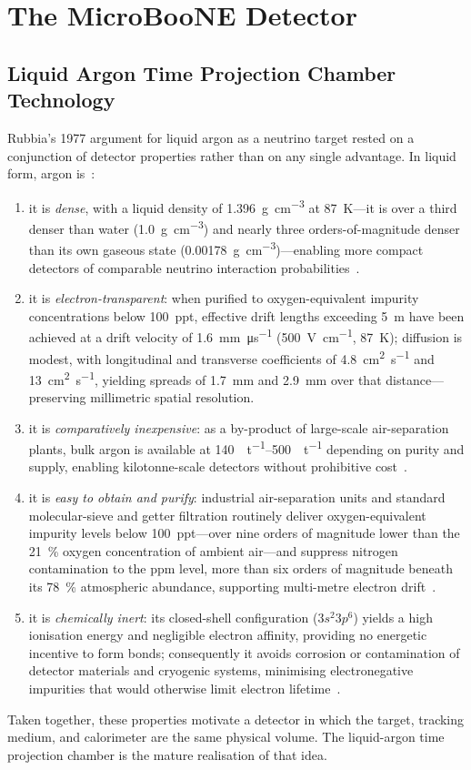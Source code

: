 \section{The MicroBooNE Detector}

\subsection{Liquid Argon Time Projection Chamber Technology}

Rubbia's 1977 argument for liquid argon as a neutrino target rested on a
conjunction of detector properties rather than on any single advantage. In
liquid form, argon is~\cite{Rubbia1977}:
\begin{enumerate}
\item it is \emph{dense}, with a liquid density of \SI{1.396}{\gram\per\cubic\centi\metre} at \qty{87}{\K}---it is over a third denser than water (\SI{1.0}{\gram\per\cubic\centi\metre}) and nearly three orders-of-magnitude denser than its own gaseous state (\SI{0.00178}{\gram\per\cubic\centi\metre})---enabling more compact detectors of comparable neutrino interaction probabilities~\cite{NISTLArDensity}.
\item it is \emph{electron-transparent}: when purified to oxygen-equivalent impurity concentrations below \qty{100}{ppt}, effective drift lengths exceeding \qty{5}{\m} have been achieved at a drift velocity of \qty{1.6}{\mm\per\micro\s} (\qty{500}{\V\per\cm}, \qty{87}{\K}); diffusion is modest, with longitudinal and transverse coefficients of \qty{4.8}{\centi\metre\squared\per\s} and \qty{13}{\centi\metre\squared\per\s}, yielding spreads of \qty{1.7}{\mm} and \qty{2.9}{\mm} over that distance---preserving millimetric spatial resolution.
\item it is \emph{comparatively inexpensive}: as a by-product of large-scale air-separation plants, bulk argon is available at \SIrange{140}{500}{\USD\per\tonne} depending on purity and supply, enabling kilotonne-scale detectors without prohibitive cost~\cite{ArgonPrice}.
\item it is \emph{easy to obtain and purify}: industrial air-separation units and standard molecular-sieve and getter filtration routinely deliver oxygen-equivalent impurity levels below \qty{100}{ppt}---over nine orders of magnitude lower than the \qty{21}{\%} oxygen concentration of ambient air---and suppress nitrogen contamination to the ppm level, more than six orders of magnitude beneath its \qty{78}{\%} atmospheric abundance, supporting multi-metre electron drift~\cite{ProtoDUNE2020,ICARUSPurity}.
\item it is \emph{chemically inert}: its closed-shell configuration ($3s^{2}3p^{6}$) yields a high ionisation energy and negligible electron affinity, providing no energetic incentive to form bonds; consequently it avoids corrosion or contamination of detector materials and cryogenic systems, minimising electronegative impurities that would otherwise limit electron lifetime~\cite{Rubbia1977}.
\end{enumerate}
Taken together, these properties motivate a detector in which the target,
tracking medium, and calorimeter are the same physical volume. The liquid-argon
time projection chamber is the mature realisation of that idea.

